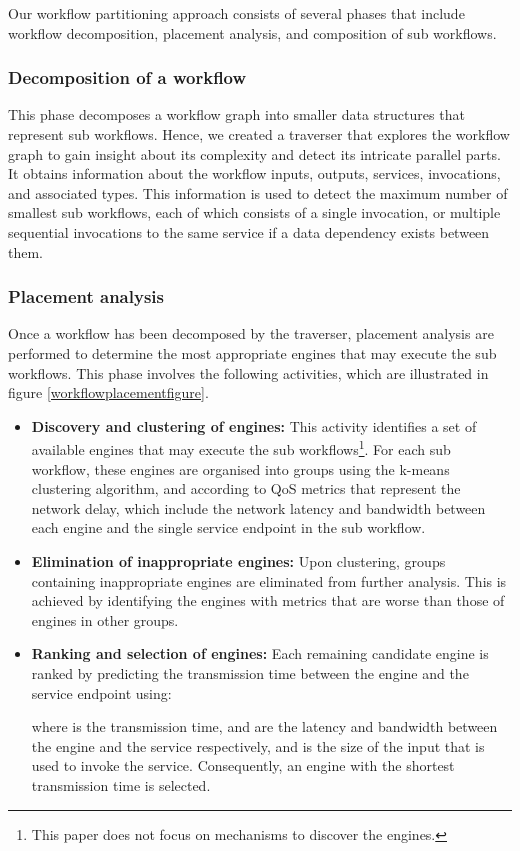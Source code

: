 \documentclass[10pt, conference, compsocconf]{IEEEtran}
\begin{document}
Our workflow partitioning approach consists of several phases that include workflow decomposition, placement analysis, and composition of sub workflows.\\

\subsubsection{Decomposition of a workflow}
This phase decomposes a workflow graph into smaller data structures that represent sub workflows.
Hence, we created a traverser that explores the workflow graph to gain insight about its complexity and detect its intricate parallel parts.
It obtains information about the workflow inputs, outputs, services, invocations, and associated types.
This information is used to detect the maximum number of smallest sub workflows, each of which consists of a single invocation, or multiple sequential invocations to the same service if a data dependency exists between them.

\subsubsection{Placement analysis}\label{Placement}
Once a workflow has been decomposed by the traverser, placement analysis are performed to determine the most appropriate engines that may execute the sub workflows.
This phase involves the following activities, which are illustrated in figure \ref{workflowplacementfigure}.
\begin{itemize}
\item \textbf{Discovery and clustering of engines:}
This activity identifies a set of available engines that may execute the sub workflows\footnote{This paper does not focus on mechanisms to discover the engines.}.
For each sub workflow, these engines are organised into groups using the k-means clustering algorithm, and according to QoS metrics that represent the network delay, which include the network latency and bandwidth between each engine and the single service endpoint in the sub workflow.
\item \textbf{Elimination of inappropriate engines:}
Upon clustering, groups containing inappropriate engines are eliminated from further analysis.
This is achieved by identifying the engines with metrics that are worse than those of engines in other groups.
\item \textbf{Ranking and selection of engines:}
Each remaining candidate engine is ranked by predicting the transmission time between the engine and the service endpoint using:

where  is the transmission time,  and  are the latency and bandwidth between the engine and the service respectively, and  is the size of the input that is used to invoke the service.
Consequently, an engine with the shortest transmission time is selected.
\end{itemize}
\end{document}
